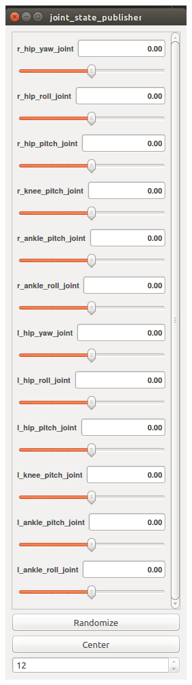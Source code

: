 \begin{figure}[!ht]
    \centering
    \begin{subfigure}[b]{0.29\textwidth}
        \centering
        \includegraphics[width=\textwidth]{chapter4/images/uthai_rviz_gui.png}

\end{subfigure}
\end{figure}
